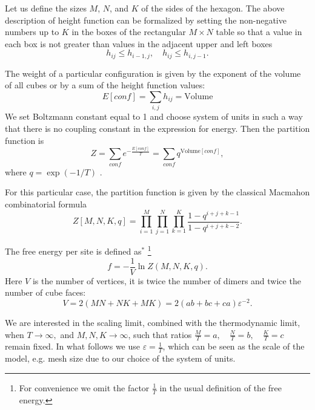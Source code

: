 \documentclass{article}
\begin{document}
Let us define the sizes $M$, $N$, and $K$ of the sides of the hexagon.
The above description of height function can be formalized by
setting the non-negative numbers up to $K$ in the boxes of the rectangular $M\times N$ table so that a value in
each box is not greater than values in the adjacent upper and left boxes
\begin{equation}
  \label{eq:1}
  h_{ij}\leq h_{i-1,j},\quad h_{ij}\leq h_{i,j-1}.
\end{equation}

The weight of a particular configuration is given by the exponent of the volume of all cubes or by a
sum of the height function values:
\begin{equation*}
  \label{eq:10}
  E[conf]=\sum_{i,j} h_{ij}=\mathrm{Volume}
\end{equation*}
We set Boltzmann constant equal to 1 and choose system of units in such a way that there is no
coupling constant in the expression for energy. Then the partition function is
\begin{equation*}
  \label{eq:14}
  Z=\sum_{conf} e^{-\frac{E[conf]}{T}}=\sum_{conf}q^{\mathrm{Volume}[conf]}, 
\end{equation*}
where $q=\exp\left(-1/T\right)$ .

For this particular case, the partition function is given by the classical Macmahon combinatorial
formula~\cite{vuletic2009generalization}
\begin{equation}
  \label{eq:12}
   Z[M,N,K,q]=\prod_{i=1}^{M}\prod_{j=1}^{N}\prod_{k=1}^{K}\frac{1-q^{i+j+k-1}}{1-q^{i+j+k-2}}.
\end{equation}

The   free energy per site is defined as$^{*}$
\footnote{For convenience we omit the factor $\frac{1}{T}$ in the usual definition of the free energy.}
\begin{equation*}
  \label{eq:17}
  f=-\frac{1}{V}\ln Z(M,N,K,q).
\end{equation*}
Here $V$ is the number of vertices, it is twice the number of dimers and twice the number of  cube faces:
\begin{equation}
  \label{eq:19}
  V=2(MN+NK+MK)=2(ab+bc+ca) \varepsilon^{-2}.
\end{equation}

We are interested in the scaling limit, combined with the thermodynamic limit, when $ T\to \infty,$
and $M,N,K\to \infty$, such that ratios $\frac{M}{T}=a,\quad \frac{N}{T}=b, \quad \frac{K}{T}=c$
remain fixed. In what follows we use $\varepsilon=\frac{1}{T}$, which can be seen as the scale of
the model, e.g. mesh size due to our choice of the system of units.
\end{document}
